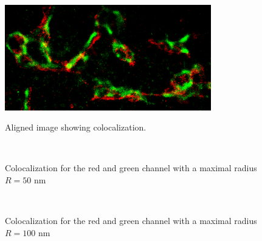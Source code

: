 \begin{figure}
\begin{minipage}[t]{0.99\textwidth}
\centering
	\includegraphics[width = 0.8\textwidth]{pictures/colocalization/cropedOrig.png}
	\caption{Aligned image showing colocalization.}
	\label{cropedOrig}	
\end{minipage}\\
\begin{minipage}[t]{0.99\textwidth}
\hfill
{}
	\caption{Colocalization for the red and green channel with a maximal radius $R=50$ nm}
	\label{radius50}	
\end{minipage}\\
\begin{minipage}[t]{0.99\textwidth}
\hfill
{}
	\caption{Colocalization for the red and green channel with a maximal radius $R=100$ nm}
	\label{radius100}	
\end{minipage}
\end{figure}